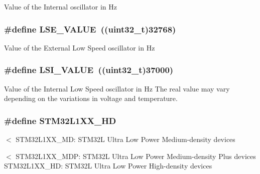 Value of the Internal oscillator in Hz \hypertarget{group___library__configuration__section_ga7bbb9d19e5189a6ccd0fb6fa6177d20d}{
\subsubsection[{L\-S\-E\-\_\-\-V\-A\-L\-U\-E}]{\setlength{\rightskip}{0pt plus 5cm}\#define L\-S\-E\-\_\-\-V\-A\-L\-U\-E~((uint32\-\_\-t)32768)}}\label{group___library__configuration__section_ga7bbb9d19e5189a6ccd0fb6fa6177d20d}
Value of the External Low Speed oscillator in Hz \hypertarget{group___library__configuration__section_ga4872023e65449c0506aac3ea6bec99e9}{
\subsubsection[{L\-S\-I\-\_\-\-V\-A\-L\-U\-E}]{\setlength{\rightskip}{0pt plus 5cm}\#define L\-S\-I\-\_\-\-V\-A\-L\-U\-E~((uint32\-\_\-t)37000)}}\label{group___library__configuration__section_ga4872023e65449c0506aac3ea6bec99e9}
Value of the Internal Low Speed oscillator in Hz The real value may vary depending on the variations in voltage and temperature. \hypertarget{group___library__configuration__section_ga9c5d143a41febbee11e6700b66822776}{
\subsubsection[{S\-T\-M32\-L1\-X\-X\-\_\-\-H\-D}]{\setlength{\rightskip}{0pt plus 5cm}\#define S\-T\-M32\-L1\-X\-X\-\_\-\-H\-D}}\label{group___library__configuration__section_ga9c5d143a41febbee11e6700b66822776}
$<$ S\-T\-M32\-L1\-X\-X\-\_\-\-M\-D\-: S\-T\-M32\-L Ultra Low Power Medium-\/density devices

$<$ S\-T\-M32\-L1\-X\-X\-\_\-\-M\-D\-P\-: S\-T\-M32\-L Ultra Low Power Medium-\/density Plus devices S\-T\-M32\-L1\-X\-X\-\_\-\-H\-D\-: S\-T\-M32\-L Ultra Low Power High-\/density devices 